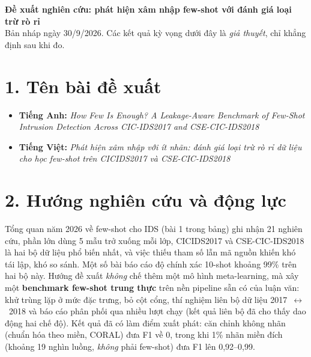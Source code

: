 \documentclass[10pt,a4paper,landscape]{article}
\begin{document}
\begin{center}
  {\Large\bfseries Đề xuất nghiên cứu: phát hiện xâm nhập few-shot với đánh giá loại trừ rò rỉ}\\[3pt]
  {\small Bản nháp ngày 30/9/2026. Các kết quả kỳ vọng dưới đây là \emph{giả thuyết}, chỉ khẳng định sau khi đo.}
\end{center}

\section*{1. Tên bài đề xuất}
\begin{itemize}
  \item \textbf{Tiếng Anh:} \emph{How Few Is Enough? A Leakage-Aware Benchmark of Few-Shot Intrusion Detection Across CIC-IDS2017 and CSE-CIC-IDS2018}
  \item \textbf{Tiếng Việt:} \emph{Phát hiện xâm nhập với ít nhãn: đánh giá loại trừ rò rỉ dữ liệu cho học few-shot trên CICIDS2017 và CSE-CIC-IDS2018}
\end{itemize}

\section*{2. Hướng nghiên cứu và động lực}
Tổng quan năm 2026 về few-shot cho IDS (bài 1 trong bảng) ghi nhận 21 nghiên cứu, phần lớn dùng 5 mẫu trở xuống mỗi lớp, CICIDS2017 và CSE-CIC-IDS2018 là hai bộ dữ liệu phổ biến nhất, và việc thiếu tham số lẫn mã nguồn khiến khó tái lập, khó so sánh. Một số bài báo cáo độ chính xác 10-shot khoảng 99\% trên hai bộ này. Hướng đề xuất \emph{không} chế thêm một mô hình meta-learning, mà xây một \textbf{benchmark few-shot trung thực} trên nền pipeline sẵn có của luận văn: khử trùng lặp ở mức đặc trưng, bỏ cột cổng, thí nghiệm liên bộ dữ liệu 2017~$\leftrightarrow$~2018 và báo cáo phân phối qua nhiều lượt chạy (kết quả liên bộ đã cho thấy dao động hai chế độ). Kết quả đã có làm điểm xuất phát: căn chỉnh không nhãn (chuẩn hóa theo miền, CORAL) đưa F1 về 0, trong khi 1\% nhãn miền đích (khoảng 19 nghìn luồng, \emph{không} phải few-shot) đưa F1 lên 0,92--0,99.
\end{document}
